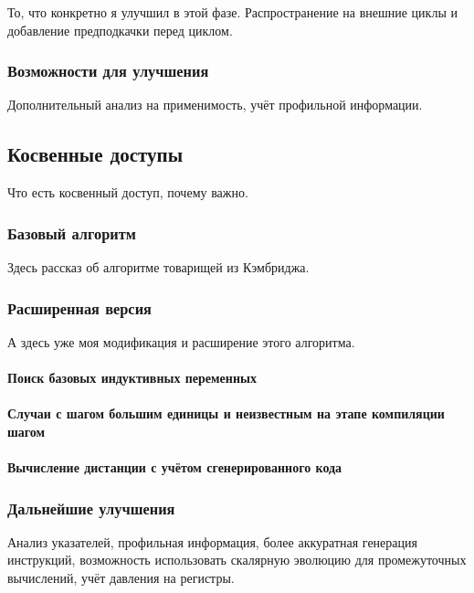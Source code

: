 \documentclass[12pt,a4paper]{article}
\begin{document}
То, что конкретно я улучшил в этой фазе. Распространение на внешние циклы и добавление предподкачки перед циклом.

\subsubsection{Возможности для улучшения}

Дополнительный анализ на применимость, учёт профильной информации.

\subsection{Косвенные доступы}

Что есть косвенный доступ, почему важно.

\subsubsection{Базовый алгоритм}

Здесь рассказ об алгоритме товарищей из Кэмбриджа.

\subsubsection{Расширенная версия}

А здесь уже моя модификация и расширение этого алгоритма.

\paragraph{Поиск базовых индуктивных переменных}

\paragraph{Случаи с шагом большим единицы и неизвестным на этапе компиляции шагом}

\paragraph{Вычисление дистанции с учётом сгенерированного кода}

\subsubsection{Дальнейшие улучшения}

Анализ указателей, профильная информация, более аккуратная генерация инструкций, возможность использовать скалярную эволюцию для промежуточных вычислений, учёт давления на регистры.
\end{document}
